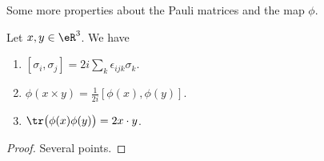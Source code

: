Some more properties about the Pauli matrices and the map \( \phi\).
\begin{proposition}
    Let \( x,y\in \eR^3\). We have
    \begin{enumerate}
        \item       \label{ITEMooDDRNooGZASBN}
            $[\sigma_i,\sigma_j]=2i\sum_k\epsilon_{ijk}\sigma_k$.
        \item       \label{ITEMooXORKooXFwQhR}
            $\phi(x\times y)=\frac{1}{ 2i }[\phi(x),\phi(y)]$.
        \item       \label{ITEMooREMBooLPVnxz}
            \( \tr\big( \phi(x)\phi(y) \big)=2x\cdot y\).
    \end{enumerate}
\end{proposition}

\begin{proof}
    Several points.


\end{proof}
